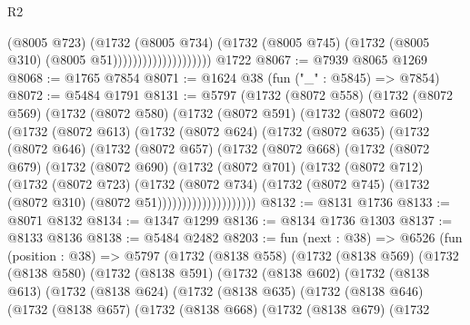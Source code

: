 \begin{lexlean}{R2}
\begin{coremodule}
                                    (@8005 @723)
                                    (@1732
                                      (@8005 @734)
                                      (@1732
                                        (@8005 @745)
                                        (@1732 (@8005 @310) (@8005 @51))))))))))))))))))))
    @1722
@8067 := @7939 @8065 @1269
@8068 := @1765 @7854
@8071 := @1624 @38 (fun ("_" : @5845) => @7854)
@8072 := @5484 @1791
@8131 := @5797
    (@1732
      (@8072 @558)
      (@1732
        (@8072 @569)
        (@1732
          (@8072 @580)
          (@1732
            (@8072 @591)
            (@1732
              (@8072 @602)
              (@1732
                (@8072 @613)
                (@1732
                  (@8072 @624)
                  (@1732
                    (@8072 @635)
                    (@1732
                      (@8072 @646)
                      (@1732
                        (@8072 @657)
                        (@1732
                          (@8072 @668)
                          (@1732
                            (@8072 @679)
                            (@1732
                              (@8072 @690)
                              (@1732
                                (@8072 @701)
                                (@1732
                                  (@8072 @712)
                                  (@1732
                                    (@8072 @723)
                                    (@1732
                                      (@8072 @734)
                                      (@1732
                                        (@8072 @745)
                                        (@1732 (@8072 @310) (@8072 @51))))))))))))))))))))
@8132 := @8131 @1736
@8133 := @8071 @8132
@8134 := @1347 @1299
@8136 := @8134 @1736 @1303
@8137 := @8133 @8136
@8138 := @5484 @2482
@8203 := fun (next : @38) =>
  @6526
    (fun (position : @38) =>
    @5797
      (@1732
        (@8138 @558)
        (@1732
          (@8138 @569)
          (@1732
            (@8138 @580)
            (@1732
              (@8138 @591)
              (@1732
                (@8138 @602)
                (@1732
                  (@8138 @613)
                  (@1732
                    (@8138 @624)
                    (@1732
                      (@8138 @635)
                      (@1732
                        (@8138 @646)
                        (@1732
                          (@8138 @657)
                          (@1732
                            (@8138 @668)
                            (@1732
                              (@8138 @679)
                              (@1732

\end{coremodule}
\end{lexlean}
